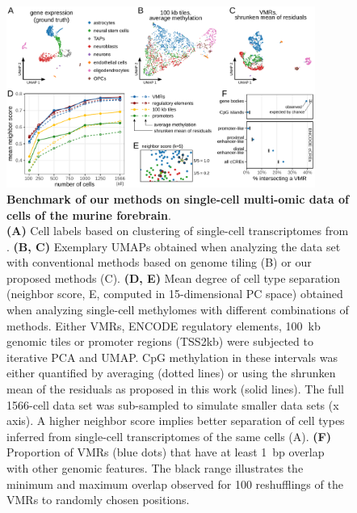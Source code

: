 \documentclass[10pt]{article}
\begin{document}
\begin{figure}[p]
	\begin{center}
		\includegraphics[width=0.9\textwidth]{figures/Fig_benchmark.pdf}
	\end{center}
	\caption{\small \textbf{Benchmark of our methods on single-cell multi-omic data of cells of the murine forebrain}.\\
		\textbf{(A)} Cell labels based on clustering of single-cell transcriptomes from \citet{kremer_scnmt}.
		\textbf{(B, C)} Exemplary UMAPs obtained when analyzing the data set with conventional methods based on genome tiling (B) or our proposed methods (C).
		\textbf{(D, E)} Mean degree of cell type separation (neighbor score, E, computed in 15-dimensional PC space) obtained when analyzing single-cell methylomes with different combinations of methods.
		Either VMRs, ENCODE regulatory elements, 100~kb genomic tiles or promoter regions (TSS\textpm2kb) were subjected to iterative PCA and UMAP.
		CpG methylation in these intervals was either quantified by averaging (dotted lines) or using the shrunken mean of the residuals as proposed in this work (solid lines).
		The full 1566-cell data set was sub-sampled to simulate smaller data sets (x axis).
		A higher neighbor score implies better separation of cell types inferred from single-cell transcriptomes of the same cells (A).
		\textbf{(F)} Proportion of VMRs (blue dots) that have at least 1~bp overlap with other genomic features.
		The black range illustrates the minimum and maximum overlap observed for 100 reshufflings of the VMRs to randomly chosen positions.
	}
	\label{fig:score}
\end{figure}
\end{document}
